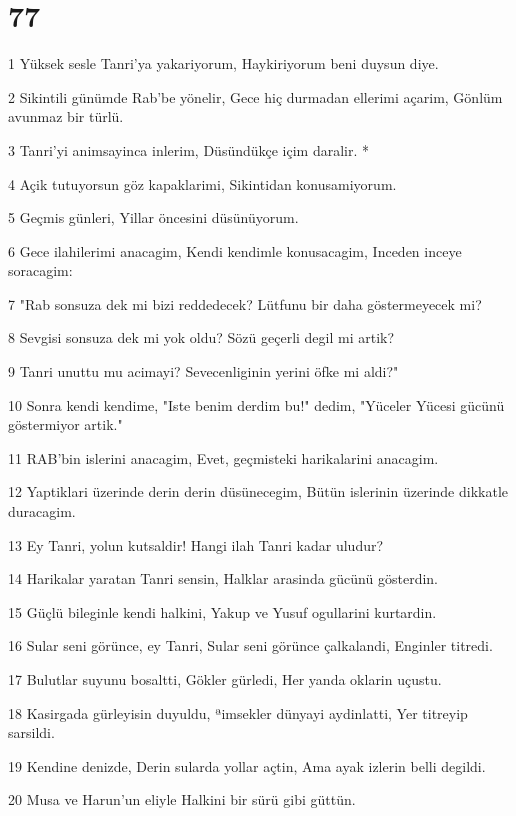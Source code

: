 \chapter{77}

\par 1 Yüksek sesle Tanri'ya yakariyorum, Haykiriyorum beni duysun diye.
\par 2 Sikintili günümde Rab'be yönelir, Gece hiç durmadan ellerimi açarim, Gönlüm avunmaz bir türlü.
\par 3 Tanri'yi animsayinca inlerim, Düsündükçe içim daralir. *
\par 4 Açik tutuyorsun göz kapaklarimi, Sikintidan konusamiyorum.
\par 5 Geçmis günleri, Yillar öncesini düsünüyorum.
\par 6 Gece ilahilerimi anacagim, Kendi kendimle konusacagim, Inceden inceye soracagim:
\par 7 "Rab sonsuza dek mi bizi reddedecek? Lütfunu bir daha göstermeyecek mi?
\par 8 Sevgisi sonsuza dek mi yok oldu? Sözü geçerli degil mi artik?
\par 9 Tanri unuttu mu acimayi? Sevecenliginin yerini öfke mi aldi?"
\par 10 Sonra kendi kendime, "Iste benim derdim bu!" dedim, "Yüceler Yücesi gücünü göstermiyor artik."
\par 11 RAB'bin islerini anacagim, Evet, geçmisteki harikalarini anacagim.
\par 12 Yaptiklari üzerinde derin derin düsünecegim, Bütün islerinin üzerinde dikkatle duracagim.
\par 13 Ey Tanri, yolun kutsaldir! Hangi ilah Tanri kadar uludur?
\par 14 Harikalar yaratan Tanri sensin, Halklar arasinda gücünü gösterdin.
\par 15 Güçlü bileginle kendi halkini, Yakup ve Yusuf ogullarini kurtardin.
\par 16 Sular seni görünce, ey Tanri, Sular seni görünce çalkalandi, Enginler titredi.
\par 17 Bulutlar suyunu bosaltti, Gökler gürledi, Her yanda oklarin uçustu.
\par 18 Kasirgada gürleyisin duyuldu, ªimsekler dünyayi aydinlatti, Yer titreyip sarsildi.
\par 19 Kendine denizde, Derin sularda yollar açtin, Ama ayak izlerin belli degildi.
\par 20 Musa ve Harun'un eliyle Halkini bir sürü gibi güttün.

